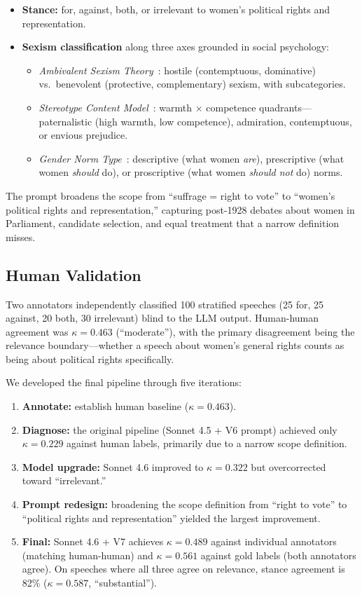 \documentclass[11pt]{article}
\begin{document}
\begin{itemize}
\item \textbf{Stance:} for, against, both, or irrelevant to women's political rights and representation.
\item \textbf{Sexism classification} along three axes grounded in social psychology:
  \begin{itemize}
  \item \emph{Ambivalent Sexism Theory}~\cite{glick1996}: hostile (contemptuous, dominative) vs.\ benevolent (protective, complementary) sexism, with subcategories.
  \item \emph{Stereotype Content Model}~\cite{fiske2002}: warmth $\times$ competence quadrants---paternalistic (high warmth, low competence), admiration, contemptuous, or envious prejudice.
  \item \emph{Gender Norm Type}~\cite{prentice2002}: descriptive (what women \emph{are}), prescriptive (what women \emph{should} do), or proscriptive (what women \emph{should not} do) norms.
  \end{itemize}
\end{itemize}

The prompt broadens the scope from ``suffrage = right to vote'' to ``women's political rights and representation,'' capturing post-1928 debates about women in Parliament, candidate selection, and equal treatment that a narrow definition misses.

\subsection{Human Validation}

Two annotators independently classified 100 stratified speeches (25 for, 25 against, 20 both, 30 irrelevant) blind to the LLM output.
Human-human agreement was $\kappa = 0.463$ (``moderate''), with the primary disagreement being the relevance boundary---whether a speech about women's general rights counts as being about political rights specifically.

We developed the final pipeline through five iterations:

\begin{enumerate}
\item \textbf{Annotate:} establish human baseline ($\kappa = 0.463$).
\item \textbf{Diagnose:} the original pipeline (Sonnet 4.5 + V6 prompt) achieved only $\kappa = 0.229$ against human labels, primarily due to a narrow scope definition.
\item \textbf{Model upgrade:} Sonnet 4.6 improved to $\kappa = 0.322$ but overcorrected toward ``irrelevant.''
\item \textbf{Prompt redesign:} broadening the scope definition from ``right to vote'' to ``political rights and representation'' yielded the largest improvement.
\item \textbf{Final:} Sonnet 4.6 + V7 achieves $\kappa = 0.489$ against individual annotators (matching human-human) and $\kappa = 0.561$ against gold labels (both annotators agree). On speeches where all three agree on relevance, stance agreement is 82\% ($\kappa = 0.587$, ``substantial'').
\end{enumerate}
\end{document}
